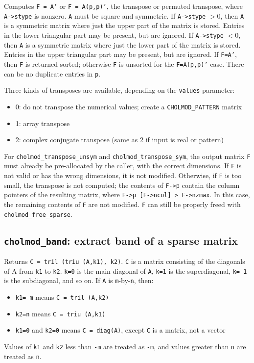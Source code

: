 \documentclass[11pt]{article}
\begin{document}

Computes {\tt F = A'} or {\tt F = A(p,p)'}, the transpose or permuted transpose, where
{\tt A->stype} is nonzero.  {\tt A} must be square and symmetric.
If {\tt A->stype} $> 0$, then {\tt A} is a symmetric matrix where just the upper part
of the matrix is stored.  Entries in the lower triangular part may be
present, but are ignored.
If {\tt A->stype} $< 0$, then {\tt A} is a symmetric matrix where just the lower part
of the matrix is stored.  Entries in the upper triangular part may be present, but are ignored.
If {\tt F=A'}, then {\tt F} is returned
sorted; otherwise {\tt F} is unsorted for the {\tt F=A(p,p)'} case.
There can be no duplicate entries in {\tt p}.

Three kinds of transposes are available, depending on the {\tt values} parameter:
\begin{itemize}
\item    0: do not transpose the numerical values; create a {\tt CHOLMOD\_PATTERN} matrix
\item    1: array transpose
\item    2: complex conjugate transpose (same as 2 if input is real or pattern)
\end{itemize}

For {\tt cholmod\_transpose\_unsym} and {\tt cholmod\_transpose\_sym}, the output matrix
{\tt F} must already be pre-allocated by the caller, with the correct dimensions.
If {\tt F} is not valid or has the wrong dimensions, it is not modified.
Otherwise, if {\tt F} is too small, the transpose is not computed; the contents
of {\tt F->p} contain the column pointers of the resulting matrix, where
{\tt F->p [F->ncol] > F->nzmax}.  In this case, the remaining contents of {\tt F} are
not modified.  {\tt F} can still be properly freed with {\tt cholmod\_free\_sparse}.

\subsection{{\tt cholmod\_band}: extract band of a sparse matrix}


Returns {\tt C = tril (triu (A,k1), k2)}.
{\tt C} is a matrix consisting of the diagonals of A from {\tt k1} to {\tt k2}.
{\tt k=0} is the main diagonal of {\tt A}, {\tt k=1} is the superdiagonal, {\tt k=-1} is the
subdiagonal, and so on.  If {\tt A} is {\tt m}-by-{\tt n}, then:
\begin{itemize}
\item {\tt k1=-m} means {\tt C = tril (A,k2)}
\item {\tt k2=n} means {\tt C = triu (A,k1)}
\item {\tt k1=0} and {\tt k2=0} means {\tt C = diag(A)}, except {\tt C} is a matrix, not a vector
\end{itemize}
Values of {\tt k1} and {\tt k2} less than {\tt -m} are treated as {\tt -m}, and values greater
than {\tt n} are treated as {\tt n}.
\end{document}
